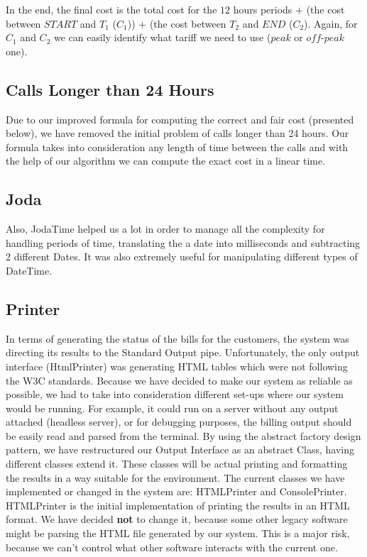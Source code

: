 \documentclass[11pt,twocolumn]{article} %
\begin{document}
In the end, the final cost is the total cost for the $12$ hours periods $+$ (the cost between $START$ and $T_1$ ($C_1$)) $+$ (the cost between $T_2$ and $END$ ($C_2$). 
Again, for $C_1$ and $C_2$ we can easily identify what tariff we need to use ($peak$ or $off$-$peak$ one).

\subsection{Calls Longer than 24 Hours}

Due to our improved formula for computing the correct and fair cost (presented below), we have removed the initial problem 
of calls longer than 24 hours. Our formula takes into consideration any length of time between the calls and 
with the help of our algorithm we can compute the exact cost in a linear time.

\subsection{Joda}
Also, JodaTime helped us a lot in order to manage all the complexity for handling periods of time,
translating the a date into milliseconds and subtracting 2 different Dates. It was also extremely useful for manipulating 
different types of DateTime.

\subsection{Printer}
In terms of generating the status of the bills for the customers, the system was directing its results to the Standard Output pipe. 
Unfortunately, the only output interface (HtmlPrinter) was generating HTML tables which were not following the W3C standards. 
Because we have decided to make our system as reliable as possible, we had to take into consideration different set-ups where our system would be running. 
For example, it could run on a server without any output attached (headless server), or for debugging purposes, 
the billing output should be easily read and parsed from the terminal. 
By using the abstract factory design pattern, we have restructured our Output Interface as an abstract Class, 
having different classes extend it. These classes will be actual printing and formatting the results in a way suitable for the environment.
The current classes we have implemented or changed in the system are: HTMLPrinter and ConsolePrinter. HTMLPrinter is the initial implementation 
of printing the results in an HTML format. We have decided \textbf{not} to change it, because some other legacy software might be parsing the
HTML file generated by our system. This is a major risk, because we can't control what other software interacts with the current one.
\end{document}
